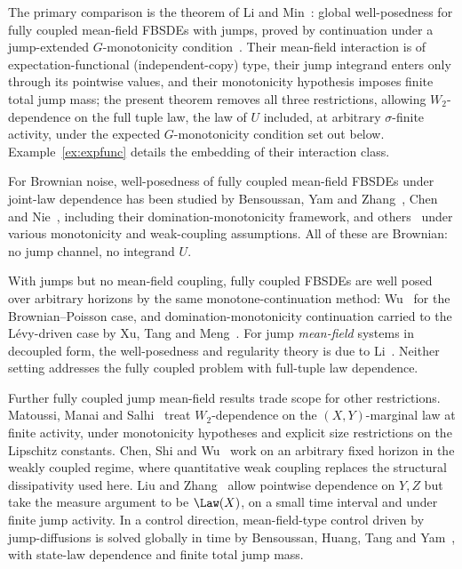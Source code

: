 The primary comparison is the theorem of Li and Min~\cite{LiMin}: global well-posedness
for fully coupled mean-field FBSDEs with jumps, proved by continuation under a
jump-extended $G$-monotonicity condition~\cite[(H3.2)]{LiMin}. Their mean-field
interaction is of expectation-functional (independent-copy) type, their jump integrand
enters only through its pointwise values, and their monotonicity hypothesis imposes
finite total jump mass; the present theorem removes all three restrictions, allowing
$W_2$-dependence on the full tuple law, the law of $U$ included, at arbitrary
$\sigma$-finite activity, under the expected $G$-monotonicity condition set out
below. Example~\ref{ex:expfunc} details the embedding of their interaction class.

For Brownian noise, well-posedness of fully coupled mean-field FBSDEs under joint-law
dependence has been studied by Bensoussan, Yam and Zhang~\cite{BYZ}, Chen and
Nie~\cite{ChenNie}, including their domination-monotonicity framework, and
others~\cite{CarmonaDelarueFBSDE,ChenNieWang,HuaLuo,MinPengQin,TianYu,WuHao,ZhangHuang}
under various monotonicity and weak-coupling assumptions. All of these are Brownian: no
jump channel, no integrand $U$.

With jumps but no mean-field coupling, fully coupled FBSDEs are well posed over arbitrary
horizons by the same monotone-continuation method: Wu~\cite{WuFBSDEP} for the
Brownian--Poisson case, and domination-monotonicity continuation carried to the
L\'evy-driven case by Xu, Tang and Meng~\cite{XuTangMeng}. For jump \emph{mean-field}
systems in decoupled form, the well-posedness and regularity theory is due to
Li~\cite{LiSPA18}. Neither setting addresses the fully coupled problem with full-tuple
law dependence.

Further fully coupled jump mean-field results trade scope for other restrictions.
Matoussi, Manai and Salhi~\cite{MMS} treat $W_2$-dependence on the $(X,Y)$-marginal law
at finite activity, under monotonicity hypotheses and explicit size restrictions on the
Lipschitz constants.
Chen, Shi and Wu~\cite{ChenShiWu} work on an arbitrary fixed horizon in the weakly
coupled regime, where quantitative weak coupling replaces the structural dissipativity
used here. Liu and Zhang~\cite{LiuZhang} allow pointwise dependence on $Y,Z$ but take the
measure argument to be $\Law(X)$, on a small time interval and under finite jump
activity. In a control direction, mean-field-type control driven by jump-diffusions is
solved globally in time by Bensoussan, Huang, Tang and Yam~\cite{BHTY}, with state-law
dependence and finite total jump mass.

